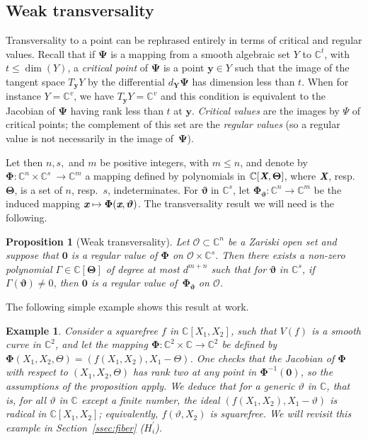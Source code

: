 \documentclass[a4paper]{article}
\def\Xb{\textit{\textbf{X}}}
\def\Thetab{\bm{\Theta}}
\def\thetab{\bm{\vartheta}}
\def\xb{\textit{\textbf{x}}}
\def\dt{s}
\def\C{\mathbb{C}}
\newtheorem{ex}[theorem]{Example}
\newtheorem{prop}[theorem]{Proposition}
\begin{document}
\subsection{Weak transversality}
Transversality to a point can be rephrased entirely in terms of
critical and regular values. Recall that if $\bm \Psi$ is a mapping
from a smooth algebraic set $Y$ to $\C^t$, with $t\le \dim(Y)$, a {\em
  critical point} of $\bm \Psi$ is a point $\bm y \in Y$ such that the
image of the tangent space $T_{\bm y} Y$ by the differential $d_{\bm
  Y} \bm \Psi$ has dimension less than $t$. When for instance
$Y=\C^v$, we have $T_{\bm y} Y=\C^v$ and this condition is equivalent
to the Jacobian of $\bm \Psi$ having rank less than $t$ at $\bm y$.
{\em Critical values} are the images by $\Psi$ of critical points; the
complement of this set are the {\em regular values} (so a regular
value is not necessarily in the image of~$\bm\Psi$).

Let then $n,\dt,$ and $m$ be positive integers, with $m \le n$, and denote
by $\bm\Phi :\C^n \times \C^{\dt} ~ \rightarrow \C^{m}$ a mapping
defined by polynomials in $\C[\Xb,\Thetab]$, where $\Xb$,
resp.\ $\Thetab$, is a set of $n$, resp.\ $\dt$, indeterminates.  For
$\thetab$ in $\C^{\dt}$, let $\bm\Phi_{\thetab} : \C^n \rightarrow
\C^{m}$ be the induced mapping $\xb\mapsto \bm\Phi(\xb,\thetab)$.  The
transversality result we will need is the following.

\begin{prop} [Weak transversality]\label{prop:weak_t}
Let $\mathscr{O} \subset \C^n$ be a Zariski open set and suppose that $\bm 0$ is a regular value of $\bm\Phi$ on $\mathscr{O} \times \C^{s}$. Then there
    exists a non-zero polynomial $\Gamma \in \C[\Thetab]$ of degree at
    most $d^{m+n}$ such that for $\thetab$ in $\C^\dt$, if
    $\Gamma(\thetab)\ne 0$, then $\bm 0$ is a regular value
    of~$\bm\Phi_{\thetab}$ on $\mathscr{O}$.
\end{prop}
\noindent 
The following simple example shows this result at work. 
%
\begin{ex}
Consider a
squarefree $f$ in $\C[X_1,X_2]$, such that $V(f)$ is a smooth curve in
$\C^2$, and let the mapping $\bm\Phi:\C^2\times \C \to \C^2$ be
defined by $\bm\Phi(X_1,X_2,\Theta) = (f(X_1,X_2), X_1-\Theta)$. One
checks that the Jacobian of $\bm\Phi$ with respect to
$(X_1,X_2,\Theta)$ has rank two at any point in $\bm\Phi^{-1}(\bm 0)$,
so the assumptions of the proposition apply. We deduce that for a
generic $\vartheta$ in $\C$, that is, for all $\vartheta$ in $\C$
except a finite number, the ideal $(f(X_1,X_2), X_1-\vartheta)$ is
radical in $\C[X_1,X_2]$; equivalently, $f(\vartheta, X_2)$ is
squarefree. We will revisit this example in Section~\ref{ssec:fiber} ($H_i^{'}$).
\end{ex}
%
\end{document}
